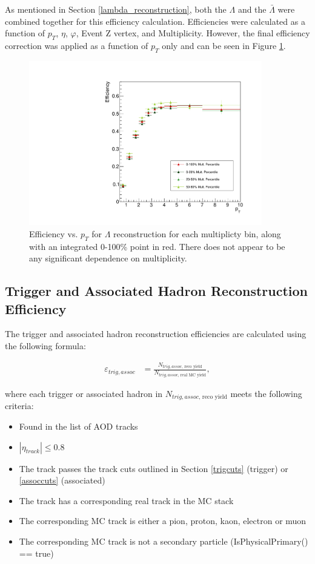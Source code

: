 \documentclass[ALICE,manyauthors]{ALICE_analysis_notes}
\begin{document}
As mentioned in Section \ref{lambda_reconstruction}, both the $\Lambda$ and the $\bar{\Lambda}$ were combined together for this efficiency calculation. Efficiencies were calculated as a function of $p_T$, $\eta$, $\varphi$, Event Z vertex, and Multiplicity. However, the final efficiency correction was applied as a function of $p_T$ only and can be seen in Figure \ref{lambda_eff}.

\begin{figure}[ht]
\centering
\includegraphics[width=4in]{figures/v0_efficiency.pdf}
\caption{Efficiency vs. $p_T$ for $\Lambda$ reconstruction for each multiplicty bin, along with an integrated 0-100\% point in red. There does not appear to be any significant dependence on multiplicity.}
\label{lambda_eff}
\end{figure}

\subsection{Trigger and Associated Hadron Reconstruction Efficiency}
\label{trigassoc_efficiency}

The trigger and associated hadron reconstruction efficiencies are calculated using the following formula:

\begin{align*}
	\varepsilon_{trig, assoc} &=  \frac{N_{trig, assoc\text{, reco yield}}}{N_{trig, assoc\text{, real MC yield}}},
\end{align*}

where each trigger or associated hadron in $N_{trig, assoc\text{, reco yield}}$ meets the following criteria:

\begin{itemize}
	\item Found in the list of AOD tracks
	\item $|\eta_{track}| \leq 0.8$
	\item The track passes the track cuts outlined in Section \ref{trigcuts} (trigger) or \ref{assoccuts} (associated)
	\item The track has a corresponding real track in the MC stack
	\item The corresponding MC track is either a pion, proton, kaon, electron or muon
	\item The corresponding MC track is not a secondary particle (IsPhysicalPrimary() == true)
\end{itemize}
\end{document}
